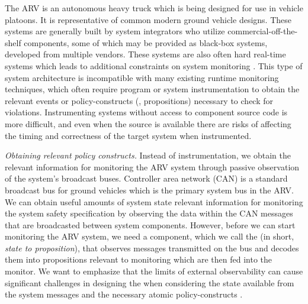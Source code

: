 The ARV is an autonomous heavy truck which is being designed for use in vehicle platoons. It is representative of common modern ground vehicle designs.
These systems are generally built by system integrators who utilize commercial-off-the-shelf  components, some of which may be provided as black-box systems,
developed from multiple vendors.
These systems are also often hard real-time systems which leads to additional constraints on system monitoring \cite{Goodloe2010}.
This type of system architecture is incompatible with many existing runtime monitoring techniques, which often require program or system instrumentation \cite{Havelund2004, Chen2003, Bonakdarpour2012,Kim2004} to obtain the relevant events or policy-constructs (\eg, propositions) necessary to check for violations.
Instrumenting systems without access to component source code is more difficult, and even when the source is available there are risks of affecting the timing and correctness of the target system when instrumented.

\noindent
\textit{Obtaining relevant policy constructs.}
Instead of instrumentation, we obtain the relevant information for monitoring the ARV system through passive observation of the system's broadcast buses. %
Controller area network (CAN) is a
standard broadcast bus for ground vehicles which is the primary system bus in the ARV. We can obtain useful amounts of system state relevant information for monitoring
the system safety specification by observing the data within the CAN messages that are broadcasted between system components.
However, before we can start monitoring the ARV system, we need a component, which we call the \sfmap (in short, \emph{state to proposition}), that observes messages transmitted on the bus and decodes
them into propositions relevant to monitoring which are then fed into the monitor.
We want to emphasize that the limits of external observability can cause significant challenges
in designing the \sfmap when considering the state available from the system messages and
the necessary atomic policy-constructs \cite{Kane2014}.

